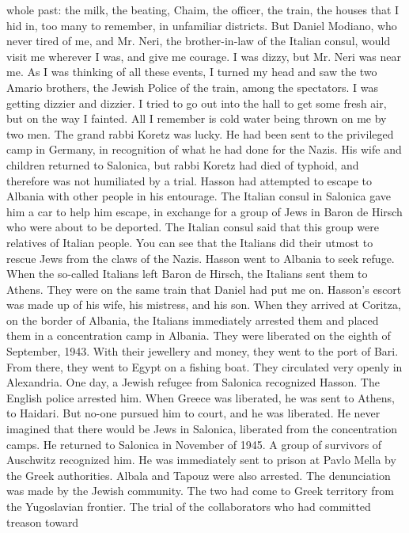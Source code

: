 whole past: the milk, the beating, Chaim, the officer, the train, the 
houses that I hid in, too many to remember, in unfamiliar districts. But 
Daniel Modiano, who never tired of me, and Mr. Neri, the brother-in-law 
of the Italian consul, would visit me wherever I was, and give me courage. I was dizzy, but Mr. Neri was near me. 
As I was thinking of all these events, I turned my head and saw the 
two Amario brothers, the Jewish Police of the train, among the spectators. I was getting dizzier and dizzier. I tried to go out into the 
hall to get some fresh air, but on the way I fainted. All I remember 
is cold water being thrown on me by two men. 
The grand rabbi Koretz was lucky. He had been sent to the privileged camp in Germany, in recognition of what he had done for the Nazis. 
His wife and children returned to Salonica, but rabbi Koretz had died 
of typhoid, and therefore was not humiliated by a trial. 
Hasson had attempted to escape to Albania with other people in his 
entourage. The Italian consul in Salonica gave him a car to help him escape, in exchange for a group of Jews in Baron de Hirsch who were about to be deported. The Italian consul said that this group were relatives of Italian people. You can see that the Italians did their 
utmost to rescue Jews from the claws of the Nazis. 
Hasson went to Albania to seek refuge. When the so-called Italians 
left Baron de Hirsch, the Italians sent them to Athens. They were on the 
same train that Daniel had put me on. 
Hasson's escort was made up of his wife, his mistress, and his son. 
When they arrived at Coritza, on the border of Albania, the Italians immediately arrested them and placed them in a concentration camp in Albania. They were liberated on the eighth of September, 1943. With their 
jewellery and money, they went to the port of Bari. From there, they 
went to Egypt on a fishing boat. They circulated very openly in Alexandria. One day, a Jewish refugee from Salonica recognized Hasson. The English police arrested him. When Greece was liberated, he was sent to Athens, to Haidari. But no-one pursued him to court, and he was liberated. He never imagined that there would be Jews in Salonica, liberated 
from the concentration camps. He returned to Salonica in November of 
1945. A group of survivors of Auschwitz recognized him. He was immediately sent to prison at Pavlo Mella by the Greek authorities. 
Albala and Tapouz were also arrested. The denunciation was made by 
the Jewish community. The two had come to Greek territory from the Yugoslavian frontier. 
The trial of the collaborators who had committed treason toward 
